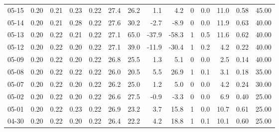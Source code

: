 \begin{threeparttable}
{\begin{tabular}{lrrrrrrrrrrrrr}
  05-15 &          0.20 &          0.21 &          0.23 &        0.22 &                27.4 &                26.2 &        1.1 &          4.2 &              0 &                 0.0 &             11.0 &            0.58 &                  45.00 \\
  05-14 &          0.20 &          0.21 &          0.28 &        0.22 &                27.6 &                30.2 &       -2.7 &         -8.9 &              0 &                 0.0 &             11.9 &            0.63 &                  40.00 \\
  05-13 &          0.20 &          0.22 &          0.21 &        0.22 &                27.1 &                65.0 &      -37.9 &        -58.3 &              1 &                 0.5 &             11.6 &            0.62 &                  40.00 \\
  05-12 &          0.20 &          0.22 &          0.20 &        0.22 &                27.1 &                39.0 &      -11.9 &        -30.4 &              1 &                 0.2 &              4.2 &            0.22 &                  40.00 \\
  05-09 &          0.20 &          0.22 &          0.20 &        0.22 &                26.8 &                25.5 &        1.3 &          5.1 &              0 &                 0.0 &              2.5 &            0.14 &                  40.00 \\
  05-08 &          0.20 &          0.22 &          0.22 &        0.22 &                26.0 &                20.5 &        5.5 &         26.9 &              1 &                 0.1 &              3.1 &            0.18 &                  35.00 \\
  05-07 &          0.20 &          0.22 &          0.20 &        0.22 &                26.2 &                25.0 &        1.2 &          5.0 &              0 &                 0.0 &              4.2 &            0.24 &                  30.00 \\
  05-02 &          0.20 &          0.22 &          0.20 &        0.22 &                26.6 &                27.5 &       -0.9 &         -3.3 &              0 &                 0.0 &              6.9 &            0.40 &                  25.00 \\
  05-01 &          0.20 &          0.22 &          0.23 &        0.22 &                26.9 &                23.2 &        3.7 &         15.8 &              1 &                 0.0 &             10.7 &            0.61 &                  25.00 \\
  04-30 &          0.20 &          0.22 &          0.20 &        0.22 &                26.4 &                22.2 &        4.2 &         18.8 &              1 &                 0.1 &             10.1 &            0.60 &                  25.00 \\

\end{tabular}}
\end{threeparttable}
